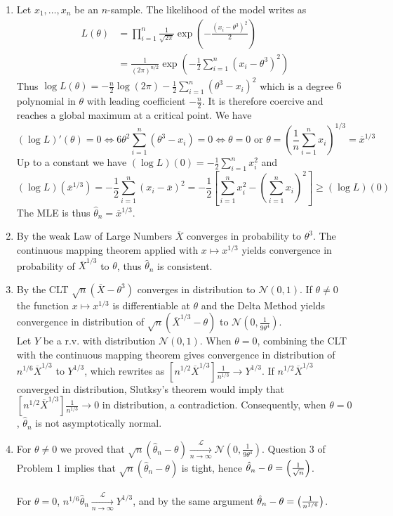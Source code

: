 \documentclass[a4paper,11pt]{article}
\let\O\relax
\DeclareMathOperator*{\O}{\mathit O_{\mathbb P}}
\begin{document}
\begin{enumerate}
  \item Let $x_1,\ldots,x_n$ be an $n$-sample. The likelihood of the model writes as $$\begin{aligned}
  L(\theta) &= \prod_{i=1}^n \frac{1}{\sqrt{2\pi}} \exp(-\frac{(x_i-\theta^3)^2}2)\\
  &= \frac{1}{(2\pi)^{n/2}}\exp\left(-\frac 12 \sum_{i=1}^n (x_i-\theta^3)^2\right)
  \end{aligned}$$
  Thus $\displaystyle \log L(\theta) = -\frac n2 \log(2\pi)-\frac 12 \sum_{i=1}^n (\theta^3-x_i)^2$ which is a degree $6$ polynomial in $\theta$ with leading coefficient $-\frac n2$. It is therefore coercive and reaches a global maximum at a critical point. We have 
  $$(\log L)'(\theta) = 0 \iff 6\theta^2\sum_{i=1}^n (\theta^3-x_i) = 0\iff \theta=0 \text{ or } \theta = \left(\frac 1n \sum_{i=1}^n x_i\right)^{1/3}=\overline x^{1/3}$$
  Up to a constant we have $(\log L)(0)= -\frac 12 \sum_{i=1}^n x_i^2$ and $$(\log L)\left(\overline x^{1/3}\right)=-\frac 12 \sum_{i=1}^n (x_i-\overline x)^2 = -\frac 12 \left[\sum_{i=1}^n x_i^2 - \left(\sum_{i=1}^n x_i\right)^2\right]\geq (\log L)(0)$$
  The MLE is thus $\hat \theta_n = \overline x^{1/3}$.
  \\
  \item By the weak Law of Large Numbers $\overline X$ converges in probability to $\theta^3$. The continuous mapping theorem applied with $x\mapsto x^{1/3}$ yields convergence in probability of $\overline X^{1/3}$ to $\theta$, thus $\hat \theta_n$ is consistent.
  \\
  \item By the CLT $\sqrt n (\overline X-\theta^3)$ converges in distribution to $\mathcal N(0,1)$. If $\theta\neq 0$ the function $x\mapsto x^{1/3}$ is differentiable at $\theta$ and the Delta Method yields convergence in distribution of $\sqrt n (\overline X^{1/3}-\theta)$ to $\mathcal N(0,\frac 1{9\theta^4})$.\\
  Let $Y$ be a r.v. with distribution $\mathcal N(0,1)$. When $\theta=0$, combining the CLT with the continuous mapping theorem gives convergence in distribution of $n^{1/6} \overline X^{1/3}$ to $Y^{1/3}$, which rewrites as $\left[n^{1/2} \overline X^{1/3}\right] \frac{1}{n^{1/3}} \to Y^{1/3}$. If $n^{1/2} \overline X^{1/3}$ converged in distribution, Slutksy's theorem would imply that $\left[n^{1/2} \overline X^{1/3}\right] \frac{1}{n^{1/3}} \to 0$ in distribution, a contradiction. Consequently, when $\theta=0$, $\hat \theta_n$ is not asymptotically normal.
  \\
  \item For $\theta\neq 0$ we proved that $\sqrt n (\hat \theta_n-\theta) \xrightarrow[n\to \infty]{\mathcal L} \mathcal N(0,\frac 1{9\theta^4})$. Question 3 of Problem 1 implies that $\sqrt n (\hat \theta_n-\theta)$ is tight, hence $\hat \theta_n-\theta = \O\left(\frac{1}{\sqrt n}\right)$.\\
  \\
  For $\theta=0$, $n^{1/6} \hat \theta_n \xrightarrow[n\to \infty]{\mathcal L} Y^{1/3}$, and by the same argument $\hat \theta_n-\theta = \O\left(\frac{1}{n^{1/6}}\right)$.
\end{enumerate}
\end{document}
